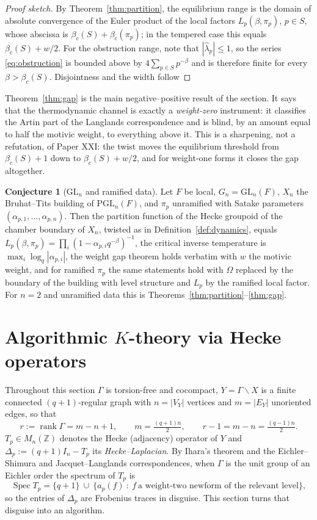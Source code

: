 \documentclass[11pt]{amsart}
\numberwithin{equation}{section}
\theoremstyle{definition}
\newtheorem{conjecture}[theorem]{Conjecture}
\theoremstyle{remark}
\newcommand{\Z}{\mathbb{Z}}
\newcommand{\rank}{\operatorname{rank}}
\newcommand{\Spec}{\operatorname{Spec}}
\newcommand{\GL}{\mathrm{GL}}
\newcommand{\PGL}{\mathrm{PGL}}
\begin{document}
\begin{proof}[Proof sketch]
By Theorem~\ref{thm:partition}, the equilibrium range is the domain of absolute
convergence of the Euler product of the local factors $L_p(\beta,\pi_p)$,
$p\in S$, whose abscissa is $\beta_c(S)+\beta_c(\pi_p)$; in the tempered case this equals
$\beta_c(S)+w/2$. For the obstruction range, note that
$|\widehat\lambda_p|\le1$, so the series \eqref{eq:obstruction} is bounded above
by $4\sum_{p\in S}p^{-\beta}$ and is therefore finite for every
$\beta>\beta_c(S)$. Disjointness and the width follow
\end{proof}

Theorem~\ref{thm:gap} is the main negative--positive result of the section. It says that
the thermodynamic channel is exactly a \emph{weight-zero} instrument: it classifies the
Artin part of the Langlands correspondence and is blind, by an amount equal to half the
motivic weight, to everything above it. This is a sharpening, not a refutation, of Paper
XXI: the twist moves the equilibrium threshold from $\beta_c(S)+1$ down to
$\beta_c(S)+w/2$, and for weight-one forms it closes the gap altogether.

\begin{conjecture}[$\GL_n$ and ramified data]\label{conj:gln}
Let $F$ be local, $G_n=\GL_n(F)$, $X_n$ the Bruhat--Tits building of $\PGL_n(F)$, and
$\pi_p$ unramified with Satake parameters $(\alpha_{p,1},\dots,\alpha_{p,n})$. Then the
partition function of the Hecke groupoid of the chamber boundary of $X_n$, twisted as in
Definition~\ref{def:dynamics}, equals $L_p(\beta,\pi_p)=\prod_i(1-\alpha_{p,i}q^{-\beta})^{-1}$,
the critical inverse temperature is $\max_i\log_q|\alpha_{p,i}|$, the weight gap theorem
holds verbatim with $w$ the motivic weight, and for ramified $\pi_p$ the same statements
hold with $\Omega$ replaced by the boundary of the building with level structure and
$L_p$ by the ramified local factor. For $n=2$ and unramified data this is
Theorems~\ref{thm:partition}--\ref{thm:gap}.
\end{conjecture}

\section{Algorithmic \texorpdfstring{$K$}{K}-theory via Hecke operators}\label{sec:ktheory}

Throughout this section $\Gamma$ is torsion-free and cocompact, $Y=\Gamma\backslash X$ is
a finite connected $(q+1)$-regular graph with $n=|V_Y|$ vertices and $m=|E_Y|$ unoriented
edges, so that
\[
r:=\rank\Gamma=m-n+1,\qquad m=\tfrac{(q+1)n}{2},\qquad r-1=m-n=\tfrac{(q-1)n}{2}.
\]
$T_p\in M_n(\Z)$ denotes the Hecke (adjacency) operator of $Y$ and
$\Delta_p:=(q+1)I_n-T_p$ its \emph{Hecke--Laplacian}. By Ihara's theorem and the
Eichler--Shimura and Jacquet--Langlands correspondences, when $\Gamma$ is the unit group
of an Eichler order the spectrum of $T_p$ is
\[
\Spec T_p=\{q+1\}\ \cup\ \{a_p(f)\ :\ f\ \text{a weight-two newform of the relevant level}\},
\]
so the entries of $\Delta_p$ are Frobenius traces in disguise. This section turns that
disguise into an algorithm.
\end{document}
